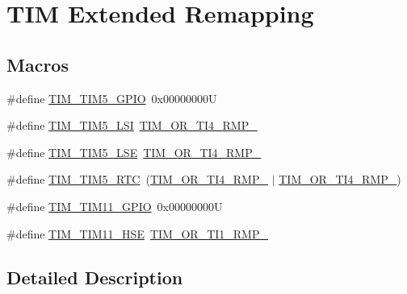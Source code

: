 \hypertarget{group___t_i_m_ex___remap}{}\section{T\+IM Extended Remapping}
\label{group___t_i_m_ex___remap}
\subsection*{Macros}
\begin{DoxyCompactItemize}
\item 
\#define \hyperlink{group___t_i_m_ex___remap_ga8525d77a5f6fea05530e812e991e4d6d}{T\+I\+M\+\_\+\+T\+I\+M5\+\_\+\+G\+P\+IO}~0x00000000U
\item 
\#define \hyperlink{group___t_i_m_ex___remap_ga62000fc12a4ed5909723b881533a2f93}{T\+I\+M\+\_\+\+T\+I\+M5\+\_\+\+L\+SI}~\hyperlink{group___peripheral___registers___bits___definition_ga9aea4f8a0abedbf08bb1e686933c1120}{T\+I\+M\+\_\+\+O\+R\+\_\+\+T\+I4\+\_\+\+R\+M\+P\+\_}
\item 
\#define \hyperlink{group___t_i_m_ex___remap_ga9f09de021d2f68730c952b4f0ebb82bc}{T\+I\+M\+\_\+\+T\+I\+M5\+\_\+\+L\+SE}~\hyperlink{group___peripheral___registers___bits___definition_gaa2a46aa18f15f2074b93233a18e85629}{T\+I\+M\+\_\+\+O\+R\+\_\+\+T\+I4\+\_\+\+R\+M\+P\+\_}
\item 
\#define \hyperlink{group___t_i_m_ex___remap_ga93e312581ffb28601b36b4f8b240df79}{T\+I\+M\+\_\+\+T\+I\+M5\+\_\+\+R\+TC}~(\hyperlink{group___peripheral___registers___bits___definition_gaa2a46aa18f15f2074b93233a18e85629}{T\+I\+M\+\_\+\+O\+R\+\_\+\+T\+I4\+\_\+\+R\+M\+P\+\_} $\vert$ \hyperlink{group___peripheral___registers___bits___definition_ga9aea4f8a0abedbf08bb1e686933c1120}{T\+I\+M\+\_\+\+O\+R\+\_\+\+T\+I4\+\_\+\+R\+M\+P\+\_})
\item 
\#define \hyperlink{group___t_i_m_ex___remap_gac8a0bac87924350651da1957081bc9ae}{T\+I\+M\+\_\+\+T\+I\+M11\+\_\+\+G\+P\+IO}~0x00000000U
\item 
\#define \hyperlink{group___t_i_m_ex___remap_ga3b08e8165670e3034401099aada7712d}{T\+I\+M\+\_\+\+T\+I\+M11\+\_\+\+H\+SE}~\hyperlink{group___peripheral___registers___bits___definition_ga98d9cdc55111a548e48df0819922852b}{T\+I\+M\+\_\+\+O\+R\+\_\+\+T\+I1\+\_\+\+R\+M\+P\+\_}
\end{DoxyCompactItemize}


\subsection{Detailed Description}


